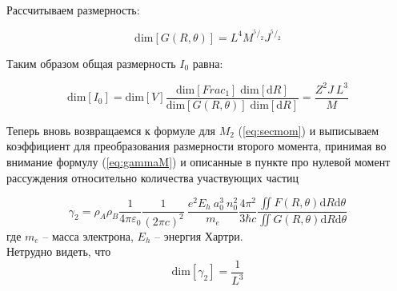 Рассчитываем размерность:

\begin{displaymath}
\text{dim}[G(R,\theta)]=L^4M^{^5\!/_2}J^{^5\!/_2}
\end{displaymath}

Таким образом общая размерность $I_0$ равна:

\begin{displaymath}
\text{dim}[I_0]=\text{dim}[V]\frac{\text{dim}[Frac_1]\;\text{dim}[\mathrm{d}R]}{\text{dim}[G(R,\theta)]\;\text{dim}[\mathrm{d}R]}=\frac{Z^2J\: L^3}{M}
\end{displaymath}

Теперь вновь возвращаемся к формуле для $M_2$ (\ref{eq:secmom}) и выписываем коэффициент для преобразования размерности второго момента, принимая во внимание формулу (\ref{eq:gammaM}) и описанные в пункте про нулевой момент рассуждения относительно количества участвующих частиц

\begin{equation}
\gamma_2=\rho_A\rho_B \frac{1}{4\pi\varepsilon_0}\frac{1}{(2\pi c)^2}\: \frac{e^2E_h\:a_0^3\:n_0^2}{m_e} \frac{4\pi^2}{3\hbar c}    \frac{\iint {F}(R,\theta)\mathrm{d}R\mathrm{d} \theta}{\iint  {G}(R,\theta)\mathrm{d}R\mathrm{d} \theta}
\end{equation}
где $m_e$ -- масса электрона, $E_h$ -- энергия Хартри.\\
Нетрудно видеть, что 
\begin{displaymath}
\text{dim}[\gamma_2]=\frac{1}{L^3}
\end{displaymath}

